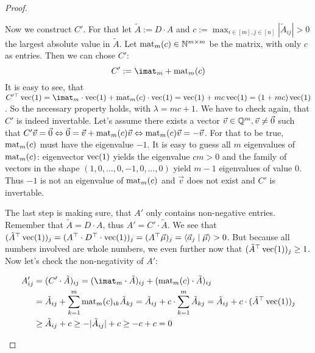 \begin{proof}
\begin{enumerate}
        Now we construct $C'$. For that let $\tilde A := D \cdot A$ and $c := \max_{i \in [m], j\in[n]} |\tilde A_{ij}| > 0$ the largest absolute value in $\tilde A$. Let $\operatorname{mat}_m(c) \in \mathbb{N}^{m\times m}$ be the matrix, with only $c$ as entries. Then we can chose $C'$:
        $$C' := \imat_m + \opmat_m(c)$$
        It is easy to see, that $C'^\top \opvec(1) = \imat_m\cdot \opvec(1) + \opmat_m(c)\cdot \opvec(1) = \opvec(1) + mc \opvec(1) = (1 + mc)\opvec(1)$. So the necessary property holds, with $\lambda = mc+1$. We have to check again, that $C'$ is indeed invertable. Let's assume there exists a vector $\vec v \in \mathbb{Q}^m, \vec v \neq \vec0$ such that $C'\vec v = \vec 0 \Leftrightarrow \vec0 = \vec v + \operatorname{mat}_m(c)\vec v \Leftrightarrow \operatorname{mat}_m(c)\vec v = -\vec v$. For that to be true, $\operatorname{mat}_m(c)$ must have the eigenvalue $-1$. It is easy to guess all $m$ eigenvalues of $\operatorname{mat}_m(c)$: eigenvector $\operatorname{vec}(1)$ yields the eigenvalue $cm>0$ and the family of vectors in the shape $(1, 0, \dots, 0, -1, 0, \dots, 0)$ yield $m-1$ eigenvalues of value $0$. Thus $-1$ is not an eigenvalue of $\operatorname{mat}_m(c)$ and $\vec v$ does not exist and $C'$ is invertable.

        The last step is making sure, that $A'$ only contains non-negative entries. Remember that $\tilde A = D \cdot A$, thus $A' = C' \cdot \tilde A$. We see that $(\tilde A^\top \operatorname{vec}(1))_j =(A^\top\cdot D^\top\cdot \operatorname{vec}(1))_j = (A^\top \vec\mu)_j = \langle \vec a_j \mid \vec\mu \rangle > 0$. But because all numbers involved are whole numbers, we even further now that $(\tilde A^\top \operatorname{vec}(1))_j \geq 1$. Now let's check the non-negativity of $A'$:

        \begin{align*}
            A'_{ij} &= (C'\cdot \tilde A)_{ij} = (\imat_m \cdot \tilde A)_{ij} + (\opmat_m(c)\cdot \tilde A)_{ij}\\
            &= \tilde A_{ij} + \sum_{k=1}^{m}\opmat_m(c)_{ik} \tilde A_{kj} = \tilde A_{ij} + c \cdot \sum_{k=1}^{m} \tilde A_{kj} = \tilde A_{ij} + c \cdot (\tilde A^\top \opvec(1))_j\\
            &\geq \tilde A_{ij} + c \geq - |\tilde A_{ij}| + c \geq - c + c = 0
        \end{align*}
        

\end{enumerate}
\end{proof}
